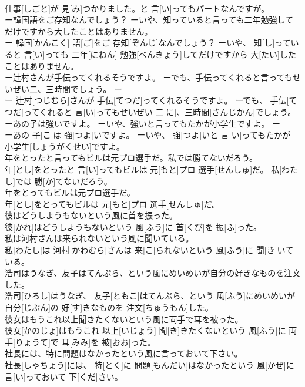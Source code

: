 \documentclass[8pt]{extreport}
\begin{document}
\begin{CJK}{UTF8}{min}
\\	仕事[しごと]が 見[み]つかりました。と 言[い]ってもパートなんですが。
\\	ー韓国語をご存知なんでしょう？ ーいや、知っていると言っても二年勉強してだけですから大したことはありません。	
\\	ー 韓国[かんこく] 語[ご]をご 存知[ぞんじ]なんでしょう？ ーいや、 知[し]っていると 言[い]っても 二年[にねん] 勉強[べんきょう]してだけですから 大[たい]したことはありません。
\\	ー辻村さんが手伝ってくれるそうですよ。 ーでも、手伝ってくれると言ってもせいぜい二、三時間でしょう。	ー
\\	ー 辻村[つじむら]さんが 手伝[てつだ]ってくれるそうですよ。 ーでも、 手伝[てつだ]ってくれると 言[い]ってもせいぜい 二[に]、三時間[さんじかん]でしょう。
\\	ーあの子は強いですよ。 ーいや、強いと言ってもたかが小学生ですよ。	ー
\\	ーあの 子[こ]は 強[つよ]いですよ。 ーいや、 強[つよ]いと 言[い]ってもたかが 小学生[しょうがくせい]ですよ。
\\	年をとったと言ってもビルは元プロ選手だ。私では勝てないだろう。	
\\	年[とし]をとったと 言[い]ってもビルは 元[もと]プロ 選手[せんしゅ]だ。 私[わたし]では 勝[か]てないだろう。
\\	年をとってもビルは元プロ選手だ。	
\\	年[とし]をとってもビルは 元[もと]プロ 選手[せんしゅ]だ。
\\	彼はどうしようもないという風に首を振った。	
\\	彼[かれ]はどうしようもないという 風[ふう]に 首[くび]を 振[ふ]った。
\\	私は河村さんは来られないという風に聞いている。	
\\	私[わたし]は 河村[かわむら]さんは 来[こ]られないという 風[ふう]に 聞[き]いている。
\\	浩司はうなぎ、友子はてんぷら、という風にめいめいが自分の好きなものを注文した。	
\\	浩司[ひろし]はうなぎ、 友子[ともこ]はてんぷら、という 風[ふう]にめいめいが 自分[じぶん]の 好[す]きなものを 注文[ちゅうもん]した。
\\	彼女はもうこれ以上聞きたくないという風に両手で耳を被った。	
\\	彼女[かのじょ]はもうこれ 以上[いじょう] 聞[き]きたくないという 風[ふう]に 両手[りょうて]で 耳[みみ]を 被[おお]った。
\\	社長には、特に問題はなかったという風に言っておいて下さい。	
\\	社長[しゃちょう]には、 特[とく]に 問題[もんだい]はなかったという 風[かぜ]に 言[い]っておいて 下[くだ]さい。

\end{CJK}
\end{document}

